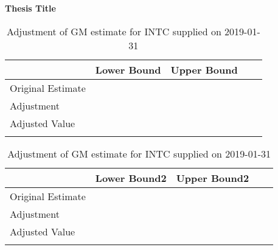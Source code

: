 \documentclass[12pt]{article}
\begin{document}
\begin{titlepage}
   \begin{center}
      \vspace*{1cm}

      \textbf{Thesis Title}

   \end{center}
\end{titlepage}

\begin{table}[]
   \begin{tabular}{@{}lllll@{}}
      & Lower Bound & Upper Bound &  &  \\ \midrule
      Original Estimate &             &             &  &  \\
      Adjustment        &             &             &  &  \\ \midrule
      Adjusted Value    &             &             &  &  \\ \midrule
      &             &             &  &  
   \end{tabular}

   \begin{tabular}{@{}lllll@{}}
      & Lower Bound2 & Upper Bound2 &  &  \\ \midrule
      Original Estimate &             &             &  &  \\
      Adjustment        &             &             &  &  \\ \midrule
      Adjusted Value    &             &             &  &  \\ \midrule
      &             &             &  &  
   \end{tabular}
 
   \caption{Adjustment of GM estimate for INTC supplied on 2019-01-31}
\end{table}
\end{document}
